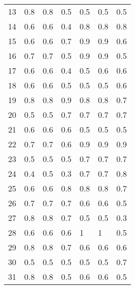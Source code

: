\begin{table}[]
\begin{tabular}{l|lll|lll}
13              & 0.8                  & 0.8       & 0.5     & 0.5     & 0.5 & 0.5     \\
14              & 0.6                  & 0.6       & 0.4     & 0.8     & 0.8 & 0.8     \\
15              & 0.6                  & 0.6       & 0.7     & 0.9     & 0.9 & 0.6     \\
16              & 0.7                  & 0.7       & 0.5     & 0.9     & 0.9 & 0.5     \\
17              & 0.6                  & 0.6       & 0.4     & 0.5     & 0.6 & 0.6     \\
18              & 0.6                  & 0.6       & 0.5     & 0.5     & 0.5 & 0.6     \\
19              & 0.8                  & 0.8       & 0.9     & 0.8     & 0.8 & 0.7     \\
20              & 0.5                  & 0.5       & 0.7     & 0.7     & 0.7 & 0.7     \\
21              & 0.6                  & 0.6       & 0.6     & 0.5     & 0.5 & 0.5     \\
22              & 0.7                  & 0.7       & 0.6     & 0.9     & 0.9 & 0.9     \\
23              & 0.5                  & 0.5       & 0.5     & 0.7     & 0.7 & 0.7     \\
24              & 0.4                  & 0.5       & 0.3     & 0.7     & 0.7 & 0.8     \\
25              & 0.6                  & 0.6       & 0.8     & 0.8     & 0.8 & 0.7     \\
26              & 0.7                  & 0.7       & 0.7     & 0.6     & 0.6 & 0.5     \\
27              & 0.8                  & 0.8       & 0.7     & 0.5     & 0.5 & 0.3     \\
28              & 0.6                  & 0.6       & 0.6     & 1       & 1   & 0.5     \\
29              & 0.8                  & 0.8       & 0.7     & 0.6     & 0.6 & 0.6     \\
30              & 0.5                  & 0.5       & 0.5     & 0.5     & 0.5 & 0.7     \\
31              & 0.8                  & 0.8       & 0.5     & 0.6     & 0.6 & 0.5     \\
\end{tabular}
\end{table}
\clearpage
